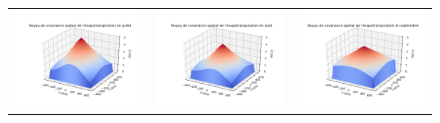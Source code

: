 \documentclass[a4paper,11pt]{article}
\numberwithin{equation}{section}
\begin{document}
\begin{figure}[H]
\begin{tabular}{ccc}
	\includegraphics[scale=0.34]{images/kernel_evap_m7.png} & \includegraphics[scale=0.34]{images/kernel_evap_m8.png} & \includegraphics[scale=0.34]{images/kernel_evap_m9.png} \\ 
\end{tabular}
\end{figure}
\end{document}
